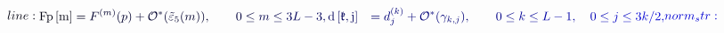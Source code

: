 \documentclass[12pt]{article}
\begin{document}
\makeatletter
\renewcommand*{\@textcolor}[3]{%
  \protect\leavevmode
  \begingroup
    \color#1{#2}#3%
  \endgroup
}
\makeatother
\begin{displaymath}
\mathcolor[RGB]{0,0,15}{line:
\begin{aligned}\begin{split}\mathrm{Fp}\left[\mathrm{m}\right]} \mathcolor[RGB]{0,0,30}{&=} \mathcolor[RGB]{0,0,45}{F^{(m)}(p)+\mathcal{O}^*(\tilde{\varepsilon}_5(m)),} \qquad \mathcolor[RGB]{0,0,60}{0\leq} \mathcolor[RGB]{0,0,75}{m\leq} \mathcolor[RGB]{0,0,90}{3L-3,\mathrm{d}\left[\mathfrak{k},\mathrm{j}\right]} \mathcolor[RGB]{0,0,105}{&=} \mathcolor[RGB]{0,0,120}{d_j^{(k)}+\mathcal{O}^*(\gamma_{k,j}),} \qquad \mathcolor[RGB]{0,0,135}{0\leq} \mathcolor[RGB]{0,0,150}{k\leq} \mathcolor[RGB]{0,0,165}{L-1,} \quad \mathcolor[RGB]{0,0,180}{0\leq} \mathcolor[RGB]{0,0,195}{j\leq} \mathcolor[RGB]{0,0,210}{3k/2,\end{split}\end{aligned}

norm_str:}
\end{displaymath}
\end{document}
